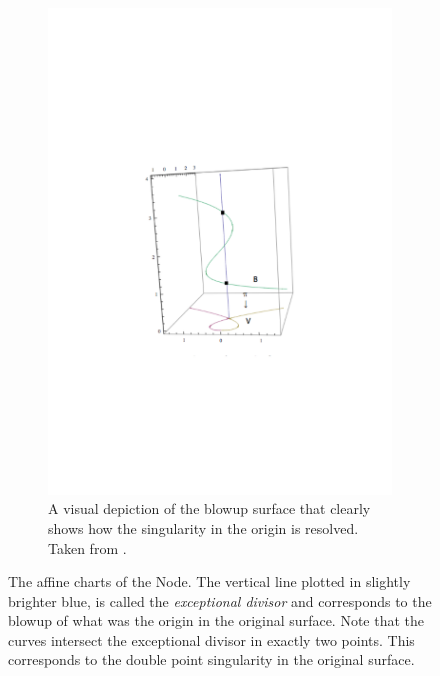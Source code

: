 \documentclass{article}
\begin{document}
\begin{example}
\begin{figure}[h]
\begin{subfigure}[t]{0.4\textwidth}
            \end{subfigure}
            \begin{subfigure}[t]{0.4\textwidth}
                \includegraphics[width=1.0\textwidth]{pictures/blow_up_intuitive.pdf}
                \caption{A visual depiction of the blowup surface that clearly
                    shows how the singularity in the origin is resolved. Taken
                from \cite{Whi08}.}
                \label{fig:blow_up_intuitive}
            \end{subfigure}
            \caption{The affine charts of the Node. The vertical line plotted
                in slightly brighter blue, is called the \emph{exceptional
                divisor} and corresponds to the
                blowup of what was the origin in the original surface. Note
                that the curves intersect the exceptional divisor in exactly
                two points. This corresponds to the double point singularity in the
                original surface.}
            \label{fig:affine_charts_node}
        \end{figure}
    \end{example}
    
\end{document}
